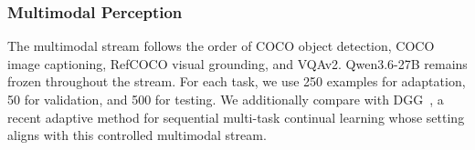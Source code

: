 \documentclass{article}
\begin{document}
\subsubsection{Multimodal Perception}
\label{sec:multimodal_experiment}

The multimodal stream follows the order of COCO object detection, COCO image
captioning, RefCOCO visual grounding, and VQAv2. Qwen3.6-27B remains frozen
throughout the stream. For each task, we use 250 examples for adaptation, 50
for validation, and 500 for testing. We additionally compare with
DGG~\citep{li2026dgg}, a recent adaptive method for sequential multi-task
continual learning whose setting aligns with this controlled multimodal stream.

\begin{table}[t]
    \centering
    \caption{
        Final performance after the four-task multimodal-perception stream with
        Qwen3.6-27B as the frozen foundation model. The Zero-shot baseline
        evaluates each task independently without sequential harness updates.
        The best and second-best results in each metric
        column are marked in bold and underlined, respectively.
    }
    \label{tab:multimodal_results}
\end{table}
\end{document}
